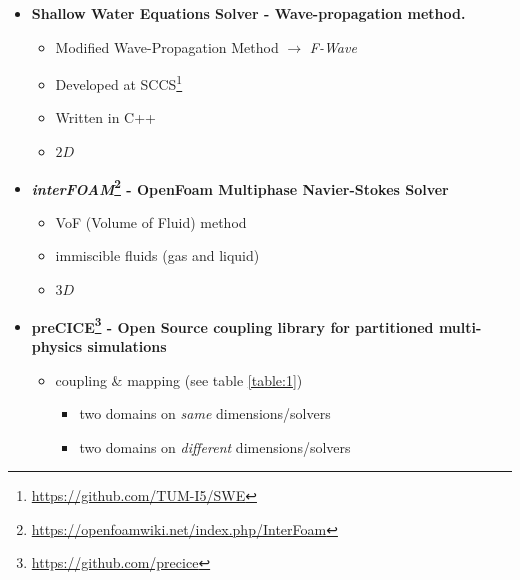 
\begin{frame}
 	
\begin{multicols}{2}
\begin{itemize}
 \setlength\itemsep{10pt}

\item<2->[]
\textbf{Shallow Water Equations Solver - Wave-propagation method.}
\begin{itemize}
\vspace{5pt}
 \setlength\itemsep{6pt}
\item Modified Wave-Propagation Method $\rightarrow$ \textit{F-Wave} \cite{levequeArticle}
\item Developed at SCCS\footnote{\url{https://github.com/TUM-I5/SWE}}
\item Written in C++
\item $2D$
\end{itemize}

\item<3->[]
\textbf{\textit{interFOAM}\footnote{\url{https://openfoamwiki.net/index.php/InterFoam}} - OpenFoam Multiphase Navier-Stokes Solver}
\begin{itemize}
\vspace{5pt}
 \setlength\itemsep{6pt}
\item VoF (Volume of Fluid) method
\item immiscible fluids (gas and liquid)
\item $3D$
\end{itemize}

\vfill\columnbreak
\item<4->[]
\textbf{preCICE\footnote{\url{https://github.com/precice}} - Open Source coupling library for partitioned multi-physics simulations}
\begin{itemize}
\vspace{5pt}
\item coupling \& mapping {\tiny (see table \ref{table:1})}
\begin{itemize}
\item two domains on \textit{same} dimensions/solvers
\item two domains on \textit{different} dimensions/solvers
\end{itemize}
\end{itemize}
\end{itemize}

\end{multicols}

\end{frame}

